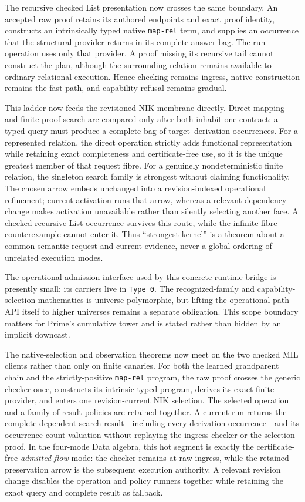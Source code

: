 \documentclass[11pt]{article}
\newcommand{\code}[1]{\texttt{#1}}
\begin{document}
The recursive checked List presentation now crosses the same boundary.  An
accepted raw proof retains its authored endpoints and exact proof identity,
constructs an intrinsically typed native \code{map-rel} term, and supplies an
occurrence that the structural provider returns in its complete answer bag.
The run operation uses only that provider.  A proof missing its recursive tail
cannot construct the plan, although the surrounding relation remains available
to ordinary relational execution.  Hence checking remains ingress, native
construction remains the fast path, and capability refusal remains gradual.

This ladder now feeds the revisioned NIK membrane directly.  Direct mapping and
finite proof search are compared only after both inhabit one contract: a typed
query must produce a complete bag of target--derivation occurrences.  For a
represented relation, the direct operation strictly adds functional
representation while retaining exact completeness and certificate-free use, so
it is the unique greatest member of that request fibre.  For a genuinely
nondeterministic finite relation, the singleton search family is strongest
without claiming functionality.  The chosen arrow embeds unchanged into a
revision-indexed operational refinement; current activation runs that arrow,
whereas a relevant dependency change makes activation unavailable rather than
silently selecting another face.  A checked recursive List occurrence survives
this route, while the infinite-fibre counterexample cannot enter it.  Thus
``strongest kernel'' is a theorem about a common semantic request and current
evidence, never a global ordering of unrelated execution modes.

The operational admission interface used by this concrete runtime bridge is
presently small: its carriers live in \code{Type 0}.  The recognized-family and
capability-selection mathematics is universe-polymorphic, but lifting the
operational path API itself to higher universes remains a separate obligation.
This scope boundary matters for Prime's cumulative tower and is stated rather
than hidden by an implicit downcast.

The native-selection and observation theorems now meet on the two checked MIL
clients rather than only on finite canaries.  For both the learned grandparent
chain and the strictly-positive \code{map-rel} program, the raw proof crosses
the generic checker once, constructs its intrinsic typed program, derives its
exact finite provider, and enters one revision-current NIK selection.  The
selected operation and a family of result policies are retained together.  A
current run returns the complete dependent search result---including every
derivation occurrence---and its occurrence-count valuation without replaying
the ingress checker or the selection proof.  In the four-mode Data algebra,
this hot segment is exactly the certificate-free \emph{admitted-flow} mode:
the checker remains at raw ingress, while the retained preservation arrow is
the subsequent execution authority.  A relevant revision change
disables the operation and policy runners together while retaining the exact
query and complete result as fallback.
\end{document}
